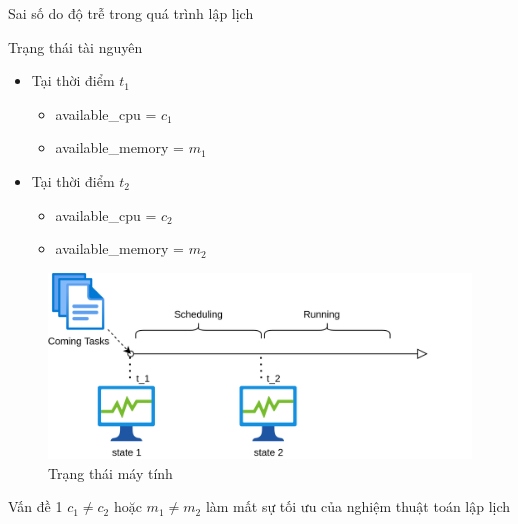 \documentclass[11pt,xcolor={dvipsnames}, aspectratio=169]{beamer}
\begin{document}
\begin{frame}
{Sai số do độ trễ trong quá trình lập lịch}
	\begin{minipage}[t]{0.4\linewidth}
		\begin{block}{Trạng thái tài nguyên}
		\begin{itemize}
			\item Tại thời điểm $t_{1}$
			\begin{itemize}
				\item available\_cpu = $c_{1}$
				\item available\_memory = $m_{1}$
			\end{itemize}
			\item  Tại thời điểm $t_{2}$
			\begin{itemize}
				\item available\_cpu = $c_{2}$
				\item available\_memory = $m_{2}$
			\end{itemize}
		\end{itemize}
		\end{block}
	\end{minipage}
	\hfill
	\begin{minipage}[t]{0.59\linewidth}
		\begin{figure}
			\centering
			\includegraphics[scale=0.5]{images/state_change.png}
			\caption{Trạng thái máy tính}
		\end{figure}
	\end{minipage}
	\pause
	\begin{center}
		\begin{block}
		{\centering Vấn đề 1}
				\centering $c_{1} \neq c_{2}$ hoặc $m_{1} \neq m_{2}$ làm mất sự tối ưu của nghiệm thuật toán lập lịch 
		\end{block}
	\end{center}
\end{frame}
\end{document}
